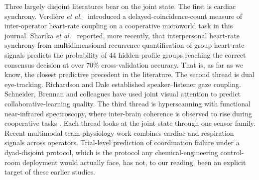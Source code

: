 Three largely disjoint literatures bear on the joint state. The first is cardiac synchrony. Verdi\`ere \emph{et al.}~\cite{verdiere2020thms} introduced a delayed-coincidence-count measure of inter-operator heart-rate coupling on a cooperative microworld task in this journal. Sharika \emph{et al.}~\cite{sharika2024heart} reported, more recently, that interpersonal heart-rate synchrony from multidimensional recurrence quantification of group heart-rate signals predicts the probability of 44 hidden-profile groups reaching the correct consensus decision at over 70\% cross-validation accuracy. That is, as far as we know, the closest predictive precedent in the literature. The second thread is dual eye-tracking. Richardson and Dale \cite{richardson2005looking} established speaker--listener gaze coupling. Schneider, Brennan and colleagues \cite{schneider2018leveraging,brennan2008coordinating,ho2021gaze} have used joint visual attention to predict collaborative-learning quality. The third thread is hyperscanning with functional near-infrared spectroscopy, where inter-brain coherence is observed to rise during cooperative tasks \cite{cui2012nirs,dumas2010interbrain,czeszumski2020hyperscanning}. Each thread looks at the joint state through one sensor family. Recent multimodal team-physiology work \cite{li2025physiological} combines cardiac and respiration signals across operators. Trial-level prediction of coordination failure under a dyad-disjoint protocol, which is the protocol any chemical-engineering control-room deployment would actually face, has not, to our reading, been an explicit target of these earlier studies.

